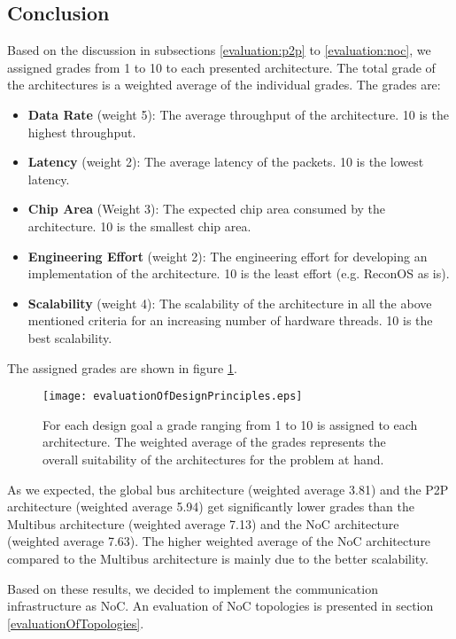 \subsection{\label{designPrinciples:conclusion}Conclusion}
Based on the discussion in subsections \ref{evaluation:p2p} to \ref{evaluation:noc}, we assigned grades from 1 to 10 to each presented architecture. The total grade of the architectures is a weighted average of the individual grades. The grades are:
\begin{itemize}
	\item \textbf{Data Rate} (weight 5): The average throughput of the architecture. 10 is the highest throughput.
	\item \textbf{Latency} (weight 2): The average latency of the packets. 10 is the lowest latency.
	\item \textbf{Chip Area} (Weight 3): The expected chip area consumed by the architecture. 10 is the smallest chip area.
	\item \textbf{Engineering Effort} (weight 2): The engineering effort for developing an implementation of the architecture. 10 is the least effort (e.g. ReconOS as is).
	\item \textbf{Scalability} (weight 4): The scalability of the architecture in all the above mentioned criteria for an increasing number of hardware threads. 10 is the best scalability.
\end{itemize}
The assigned grades are shown in figure \ref{evaluationOfDesignPrinciples.eps}.
\begin{figure}
  \begin{center}
		 \texttt{[image: evaluationOfDesignPrinciples.eps]}
  \caption{For each design goal a grade ranging from 1 to 10 is assigned to each architecture. The weighted average of the grades represents the overall suitability of the architectures for the problem at hand.}
  \label{evaluationOfDesignPrinciples.eps}
  \end{center}
\end{figure}
As we expected, the global bus architecture (weighted average 3.81) and the P2P architecture (weighted average 5.94) get significantly lower grades than the Multibus architecture (weighted average 7.13) and the NoC architecture (weighted average 7.63). The higher weighted average of the NoC architecture compared to the Multibus architecture is mainly due to the better scalability.

Based on these results, we decided to implement the communication infrastructure as NoC. An evaluation of NoC topologies is presented in section \ref{evaluationOfTopologies}.





